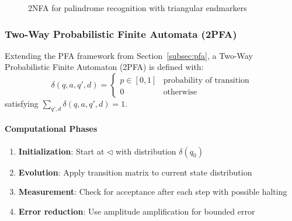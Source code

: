 \begin{figure}[h]
    \centering  
    \caption{2NFA for palindrome recognition with triangular endmarkers}
    \label{fig:2nfa-example}
\end{figure}

\subsubsection{Two-Way Probabilistic Finite Automata (2PFA)}
\label{subsubsec:2pfa}

Extending the PFA framework from Section~\ref{subsec:pfa}, a Two-Way Probabilistic Finite Automaton (2PFA) \cite{freivalds1981probabilistic} is defined with:
\[
\delta(q, a, q', d) = 
\begin{cases} 
p \in [0,1] & \text{probability of transition} \\
0 & \text{otherwise}
\end{cases}
\]
satisfying \( \sum_{q',d} \delta(q, a, q', d) = 1 \).

\paragraph{Computational Phases}
\begin{enumerate}
    \item \textbf{Initialization}: Start at \( \triangleleft \) with distribution \( \delta(q_0) \)
    \item \textbf{Evolution}: Apply transition matrix to current state distribution
    \item \textbf{Measurement}: Check for acceptance after each step with possible halting
    \item \textbf{Error reduction}: Use amplitude amplification for bounded error \cite{nielsen2010quantum}
\end{enumerate}

